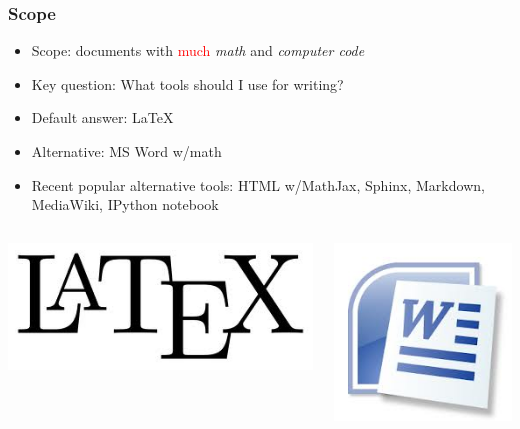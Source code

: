 \documentclass{beamer}
\begin{document}
\begin{frame}
\begin{columns}
\vspace{6mm}


\end{columns}
\end{frame}

\begin{frame}
\frametitle{Scope}


\begin{itemize}
\pause
  \item Scope: documents with \textcolor{red}{much} \emph{math} and \emph{computer code}

\pause
  \item Key question: What tools should I use for writing?

\pause
  \item Default answer: {\LaTeX}

\pause
  \item Alternative: MS Word w/math

\pause
  \item Recent popular alternative tools: HTML w/MathJax, Sphinx, Markdown, MediaWiki, IPython notebook
\end{itemize}

\noindent

\begin{columns}
\vspace{6mm}

\centerline{\includegraphics[width=0.3\linewidth]{testfigs/LaTeX_logo.jpg}}

\vspace{6mm}


\vspace{6mm}

\centerline{\includegraphics[width=0.2\linewidth]{testfigs/MS_Word_logo.jpg}}


\end{columns}
\end{frame}
\end{document}
